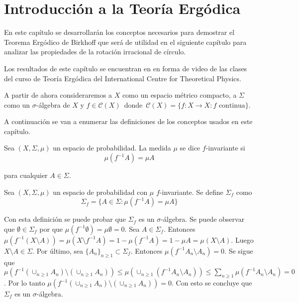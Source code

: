 \chapter{Introducción a la Teoría Ergódica}

En este capítulo se desarrollarán los conceptos necesarios para  demostrar el Teorema Ergódico de Birkhoff que será de utilidad en el siguiente capítulo para analizar las propiedades de la rotación irracional de círculo.

Los resultados de este capítulo se encuentran en \cite{youtube} en forma de video de las clases del curso de Teoría Ergódica del International Centre for Theoretical Physics.

A partir de ahora consideraremos a $X$ como un espacio métrico compacto, a $\Sigma$ como un $\sigma$-álgebra de $X$ y \mbox{$f \in \mathcal{C}(X)$ donde $\mathcal{C}(X) = \{f: X \rightarrow X: f \text{ continua}\}$}.

A continuación se van a enumerar las definiciones de los conceptos usados en este capítulo.

\begin{definicion}
	Sea $(X,\Sigma,\mu)$ un espacio de probabilidad. La medida $\mu$ se dice $f$-invariante si	
	\begin{equation}
		\mu(f^{-1}A) = \mu A
	\end{equation}
	
	para cualquier $A \in \Sigma$.
\end{definicion}

\begin{definicion}
	Sea $(X,\Sigma,\mu)$ un espacio de probabilidad  con $\mu$ $f$-invariante. Se define $\Sigma_f$ como	
	\begin{equation}
		\Sigma_f = \{ A \in \Sigma: \mu(f^{-1}A) = \mu A \}
	\end{equation}
\end{definicion}

Con esta definición se puede probar que $\Sigma_f$ es un $\sigma$-álgebra. Se puede observar que $\emptyset \in \Sigma_f$ por que $\mu(f^{-1} \emptyset) = \mu \emptyset = 0$. Sea $A \in \Sigma_f$. Entonces $\mu(f^{-1}(X \setminus A)) =  \mu(X \setminus f^{-1}A) = 1 - \mu(f^{-1}A) = 1 - \mu A = \mu(X \setminus A)$. Luego $X \setminus A \in \Sigma$. Por último, sea $\{A_n\}_{n \geq 1} \subset \Sigma_f$. Entonces $\mu(f^{-1}A_n \setminus A_n) = 0$. Se sigue que $\mu(f^{-1}(\cup_{n \geq 1} A_n) \setminus (\cup_{n \geq 1} A_n)) \leq \mu(\cup_{n \geq 1} (f^{-1}A_n \setminus A_n)) \leq \sum_{n \geq 1} \mu(f^{-1}A_n \setminus A_n) = 0$. Por lo tanto $\mu(f^{-1}(\cup_{n \geq 1} A_n) \setminus (\cup_{n \geq 1} A_n)) = 0$. Con esto se concluye que $\Sigma_f$ es un $\sigma$-álgebra. 

